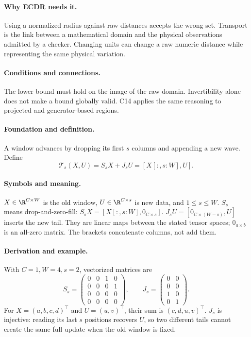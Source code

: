 \paragraph{Why ECDR needs it.}
Using a normalized radius against raw distances accepts the wrong set.
Transport is the link between a mathematical domain and the physical
observations admitted by a checker. Changing units can change a raw
numeric distance while representing the same physical variation.
\paragraph{Conditions and connections.}
The lower bound must hold on the image of the raw domain. Invertibility
alone does not make a bound globally valid. C14 applies the same reasoning
to projected and generator-based regions.

\paragraph{Foundation and definition.}
A window advances by dropping its first $s$ columns and appending a new
wave. Define
\[
 \mathcal T_s(X,U)=S_sX+J_sU=[X[:,s:W],U].
\]
\paragraph{Symbols and meaning.}
$X\in\R^{C\times W}$ is the old window, $U\in\R^{C\times s}$ is new
data, and $1\le s\le W$. $S_s$ means drop-and-zero-fill:
$S_sX=[X[:,s:W],0_{C\times s}]$.
$J_sU=[0_{C\times(W-s)},U]$ inserts the new tail. They are linear maps
between the stated tensor spaces; $0_{a\times b}$ is an all-zero matrix.
The brackets concatenate columns, not add them.
\paragraph{Derivation and example.}
With $C=1,W=4,s=2$, vectorized matrices are
\[
 S_s=\begin{pmatrix}0&0&1&0\\0&0&0&1\\0&0&0&0\\0&0&0&0\end{pmatrix},
 \qquad J_s=\begin{pmatrix}0&0\\0&0\\1&0\\0&1\end{pmatrix}.
\]
For $X=(a,b,c,d)^\top$ and $U=(u,v)^\top$, their sum is
$(c,d,u,v)^\top$. $J_s$ is injective: reading its last $s$ positions
recovers $U$, so two different tails cannot create the same full update
when the old window is fixed.
